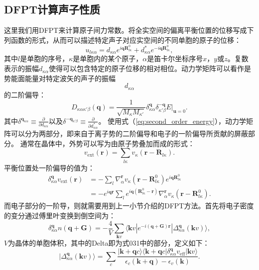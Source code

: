\documentclass[phd,nobackinfo]{scutthesis}
\begin{document}
\subsection{DFPT计算声子性质}
这里我们用DFPT来计算原子间力常数。将全实空间的偏离平衡位置的位移写成下列函数的形式，从而可以描述特定声子对应实空间的不同单胞的原子的位移：
\begin{equation}
  u_{l\kappa\alpha} = d_{\kappa\alpha}e^{i\bm{q}\bm{R}^0_{l\kappa}} + d^*_{\kappa\alpha}e^{-i\bm{q}\bm{R}^0_{l\kappa}},
\end{equation}
其中$l$是单胞的序号，$\kappa$是单胞内的某个原子，$\alpha$是笛卡尔坐标序号$x$，$y$或$z$。复数表示的振幅$d_{\kappa\alpha}$使得可以包含特定的原子位移的相对相位。动力学矩阵可以看作是势能面能量对特定波矢的声子的振幅$$d_{\kappa\alpha}$$的二阶偏导：
\begin{equation}
  D_{\kappa\alpha\kappa'\beta}(\bm{q}) =
  \frac{1}{\sqrt{M_\kappa M_{\kappa'}}} \delta^{\bm{q}}_{\kappa\alpha} \delta^{-\bm{q}}_{\kappa'\beta} E \bigg|_{\bm{u}=0}.
\end{equation}
其中$\delta^{\bm{q}_{\kappa\alpha}}\equiv \frac{\partial}{\partial d_{\kappa\alpha}}$以及$\delta^{\bm{-q}_{\kappa'\beta}}\equiv \frac{\partial}{\partial d^*_{\kappa\alpha}}$。
使用式（\ref{eq:second_order_energy}），动力学矩阵可以分为两部分，即来自于离子势的二阶偏导和电子的一阶偏导所贡献的屏蔽部分。
通常在晶体中，外势可以写为由原子势叠加而成的形式：
\begin{equation}
  v_\mathrm{ext}(\bm{r}) = \sum_{l\kappa} v_\kappa (\bm{r}-\bm{R}_{l\kappa}).
\end{equation}
平衡位置处一阶偏导的值为：
\begin{align}
  \delta^{\bm{q}}_{\kappa\alpha}v_{\mathrm{ext}}(\bm{r}) &=
  - \sum_l \nabla^{\bm{r}}_\alpha v_\kappa (\bm{r}-\bm{R}^0_{l\kappa})e^{i\bm{q}\bm{R}^0_{l\kappa}} \\
  &= -e^{i\bm{qr}} \sum_l e^{i\bm{q} (\bm{R}^0_{l\kappa}-\bm{r})} \nabla^{\bm{r}}_\alpha v_\kappa(\bm{r}-\bm{R}^0_{l\kappa}).
\end{align}
而电子部分的一阶导，则就需要用到上一小节介绍的DFPT方法。首先将电子密度的变分通过傅里叶变换到倒空间为：
\begin{equation}
  \delta^{\bm{q}}_{\kappa\alpha} n(\bm{q}+\bm{G}) = - \frac{4}{V}\sum_{\bm{k}v} \langle \bm{k}v| e^{-i(\bm{q}+\bm{G})\bm{r}}| \Delta^{\bm{q}}_{\kappa\alpha}(\bm{k}v) \rangle,
\end{equation}
$V$为晶体的单胞体积，其中的Delta即为式031中的部分，定义如下：
\begin{equation}
  | \Delta^{\bm{q}}_{\kappa\alpha}(\bm{k}v) \rangle =
  \sum_c \frac{|\bm{k}+\bm{q}c\rangle \langle \bm{k}+\bm{q}c | \delta^{\bm{q}}_{\kappa\alpha} v_\mathrm{eff} | \bm{k}v \rangle}
  {\epsilon_c(\bm{k}+\bm{q})-\epsilon_v(\bm{k})}.
\end{equation}
\end{document}
